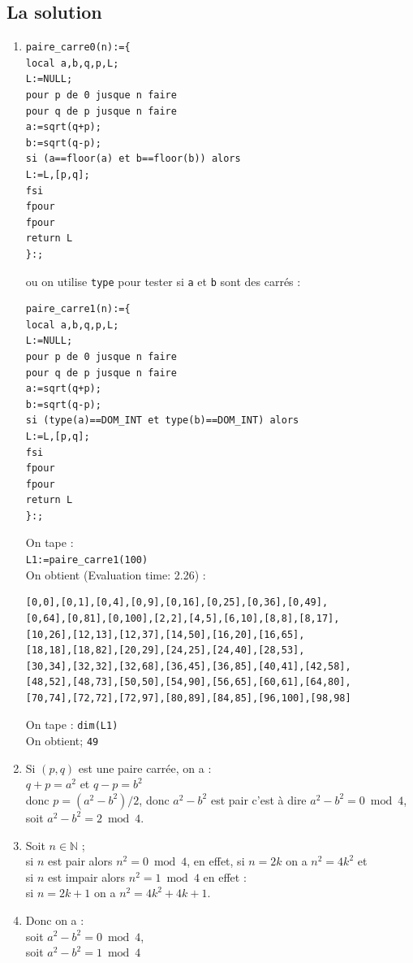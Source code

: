 \documentclass[a4paper,11pt]{book}
\newcommand{\N}{{\mathbb{N}}}
\begin{document}
\subsection{La solution}
\begin{enumerate}
\item 
\begin{verbatim}
paire_carre0(n):={
local a,b,q,p,L;
L:=NULL;
pour p de 0 jusque n faire
pour q de p jusque n faire
a:=sqrt(q+p);
b:=sqrt(q-p);
si (a==floor(a) et b==floor(b)) alors
L:=L,[p,q];
fsi
fpour
fpour
return L
}:;
\end{verbatim}
ou on utilise {\tt type} pour tester si {\tt a} et {\tt b} sont des carr\'es :
\begin{verbatim}
paire_carre1(n):={
local a,b,q,p,L;
L:=NULL;
pour p de 0 jusque n faire
pour q de p jusque n faire
a:=sqrt(q+p);
b:=sqrt(q-p);
si (type(a)==DOM_INT et type(b)==DOM_INT) alors
L:=L,[p,q];
fsi
fpour
fpour
return L
}:;
\end{verbatim}
On tape :\\
{\tt L1:=paire\_carre1(100)}\\
On obtient (Evaluation time: 2.26) :
\begin{verbatim}
[0,0],[0,1],[0,4],[0,9],[0,16],[0,25],[0,36],[0,49],
[0,64],[0,81],[0,100],[2,2],[4,5],[6,10],[8,8],[8,17],
[10,26],[12,13],[12,37],[14,50],[16,20],[16,65],
[18,18],[18,82],[20,29],[24,25],[24,40],[28,53],
[30,34],[32,32],[32,68],[36,45],[36,85],[40,41],[42,58],
[48,52],[48,73],[50,50],[54,90],[56,65],[60,61],[64,80],
[70,74],[72,72],[72,97],[80,89],[84,85],[96,100],[98,98]
\end{verbatim}
On tape : {\tt dim(L1)}\\
On obtient; {\tt 49}
\item Si $(p,q)$ est une paire carr\'ee, on a :\\
$q+p=a^2$ et $q-p=b^2$\\
donc $p=(a^2-b^2)/2$, donc $a^2-b^2$ est pair c'est \`a dire 
$a^2-b^2=0 \bmod 4$, soit $a^2-b^2=2 \bmod 4$. 
\item Soit $n \in \N$ ;\\ 
si $n$ est pair alors $n^2=0 \bmod 4$, en effet, si $n=2k$ on a 
$n^2=4k^2$ et\\ 
si $n$ est impair alors $n^2=1 \bmod 4$ en effet :\\
si $n=2k+1$ on a $n^2=4k^2+4k+1$.
\item Donc on a :\\
soit $a^2-b^2=0 \bmod 4$,\\
 soit $a^2-b^2=1 \bmod 4$ \\

\end{enumerate}
\end{document}
